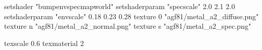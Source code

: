 setshader "bumpenvspecmapworld"
setshaderparam "specscale" 2.0 2.1 2.0
setshaderparam "envscale"  0.18 0.23 0.28
   texture 0 "agf81/metal_a2_diffuse.png"
   texture n "agf81/metal_a2_normal.png"
   texture s "agf81/metal_a2_spec.png"

texscale 0.6
texmaterial 2
